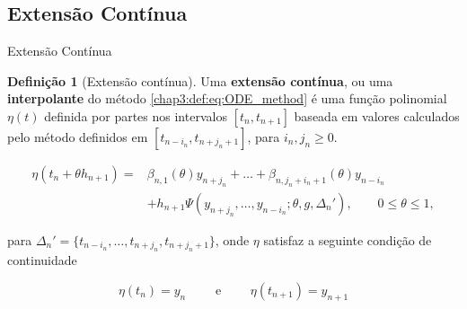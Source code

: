 \documentclass{beamer}
\theoremstyle{plain}
\theoremstyle{definition}
\newtheorem{defi}{Definição}
\begin{document}
\subsection{Extensão Contínua}
\begin{frame}{Extensão Contínua}


    \small
    \begin{defi}[Extensão contínua]
        Uma \textbf{extensão contínua}, ou uma \textbf{interpolante} do método \eqref{chap3:def:eq:ODE_method} é uma função polinomial $\eta(t)$ definida por partes nos intervalos $[t_n, t_{n+1}]$ baseada em valores calculados pelo método definidos em $[t_{n - i_n}, t_{n+j_n + 1}]$, para $i_n, j_n \geq 0$. 

        \scriptsize
        \begin{equation}
            \begin{split}
                \eta(t_n + \theta h_{n+1}) = &\beta_{n, 1} (\theta) y_{n + j_n} + \dots + \beta_{n, j_n + i_n + 1}(\theta) y_{n - i_n} \\
                                             &+ h_{n+1} \Psi(y_{n+j_n}, \dots, y_{n-i_n}; \theta, g, \Delta _n '), \qquad 0 \leq \theta \leq 1,
                                             \label{chap3:def:eq:Interpolant_extension}
            \end{split}
        \end{equation}

        \noindent
        \normalsize
        para $\Delta _n ' = \{ t_{n - i_n} , \dots, t_{n+j_n}, t_{n +j_n + 1} \}$, onde $\eta$ satisfaz a seguinte condição de continuidade

        \scriptsize
        \begin{equation}
            \eta(t_n) = y_n \qquad  \text{ e } \qquad \eta(t_{n+1}) = y_{n+1}
            \label{chap3:def:eq:continuity_condition}
        \end{equation}

    \end{defi}

\end{frame}
 

\end{document}
